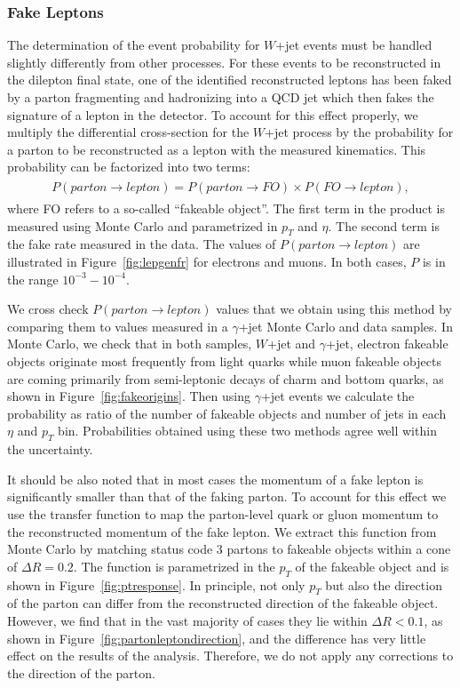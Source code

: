 \subsubsection{Fake Leptons}
\label{sec:FakeLeptons}
The determination of the event probability for $W$+jet events must be handled slightly differently from other processes.
For these events to be reconstructed in the dilepton final state, one of the identified reconstructed leptons has been
faked by a parton fragmenting and hadronizing into a QCD jet which then fakes the signature of a lepton in the detector. 
To account for this effect properly, we multiply the differential cross-section for the $W$+jet process by the 
probability for a parton to be reconstructed as a lepton with the measured kinematics. This probability can be 
factorized into two terms:
\begin{eqnarray}
\begin{array}{lcl}
P(parton\rightarrow lepton)=P(parton\rightarrow FO) \times P(FO\rightarrow lepton),
\end{array} 
\end{eqnarray} 
where FO refers to a so-called ``fakeable object''. The first term in the product is measured using Monte Carlo and 
parametrized in $p_{T}$ and $\eta$. The second term is the fake rate measured in the data. The values 
of $P(parton \rightarrow lepton)$ are illustrated in Figure~\ref{fig:lepgenfr} for electrons and muons.
In both cases, $P$ is in the range $10^{-3}-10^{-4}$.

We cross check $P(parton \rightarrow lepton)$ values that we obtain using this method by comparing them to values 
measured in a $\gamma$+jet Monte Carlo and data samples.  In Monte Carlo, we check that in both samples, $W$+jet and  $\gamma$+jet,
electron fakeable objects originate most frequently from light quarks while muon fakeable objects are coming primarily
from semi-leptonic decays of charm and bottom quarks, as shown in Figure~\ref{fig:fakeorigins}.
Then using  $\gamma$+jet events we calculate the probability as ratio of the number of fakeable objects and number of jets in each $\eta$ and $p_{T}$ bin.
Probabilities obtained using these two methods agree well within the uncertainty. 

It should be also noted that in most cases the momentum of a fake lepton is significantly smaller than that of the faking parton.
To account for this effect we use the transfer function to map the parton-level quark or gluon momentum to the reconstructed
momentum of the fake lepton.
We extract this function from Monte Carlo by matching status code 3 partons to fakeable objects within a
cone of $\Delta R=0.2$.
The function is parametrized in the $p_{T}$ of the fakeable object and is shown in Figure~\ref{fig:ptresponse}.
In principle, not only $p_{T}$ but also the direction of the parton can differ from the reconstructed direction of the fakeable object.
However, we find that in the vast majority of cases they lie within $\Delta R<0.1$, as shown in Figure~\ref{fig:partonleptondirection},
and the difference has very little effect on the results of the analysis. Therefore, we do not apply any corrections to the direction
of the parton.


